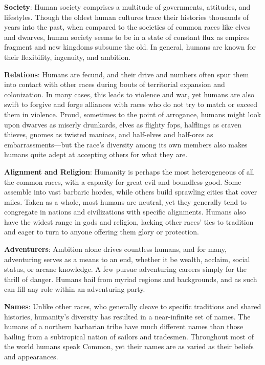 \textbf{Society}: Human society comprises a multitude of governments, attitudes, and lifestyles. Though the oldest human cultures trace their histories thousands of years into the past, when compared to the societies of common races like elves and dwarves, human society seems to be in a state of constant flux as empires fragment and new kingdoms subsume the old. In general, humans are known for their flexibility, ingenuity, and ambition.
				
\textbf{Relations}: Humans are fecund, and their drive and numbers often spur them into contact with other races during bouts of territorial expansion and colonization. In many cases, this leads to violence and war, yet humans are also swift to forgive and forge alliances with races who do not try to match or exceed them in violence. Proud, sometimes to the point of arrogance, humans might look upon dwarves as miserly drunkards, elves as flighty fops, halflings as craven thieves, gnomes as twisted maniacs, and half-elves and half-orcs as embarrassments---but the race's diversity among its own members also makes humans quite adept at accepting others for what they are. 
				
\textbf{Alignment and Religion}: Humanity is perhaps the most heterogeneous of all the common races, with a capacity for great evil and boundless good. Some assemble into vast barbaric hordes, while others build sprawling cities that cover miles. Taken as a whole, most humans are neutral, yet they generally tend to congregate in nations and civilizations with specific alignments. Humans also have the widest range in gods and religion, lacking other races' ties to tradition and eager to turn to anyone offering them glory or protection.
				
\textbf{Adventurers}: Ambition alone drives countless humans, and for many, adventuring serves as a means to an end, whether it be wealth, acclaim, social status, or arcane knowledge. A few pursue adventuring careers simply for the thrill of danger. Humans hail from myriad regions and backgrounds, and as such can fill any role within an adventuring party.
				
\textbf{Names}: Unlike other races, who generally cleave to specific traditions and shared histories, humanity's diversity has resulted in a near-infinite set of names. The humans of a northern barbarian tribe have much different names than those hailing from a subtropical nation of sailors and tradesmen. Throughout most of the world humans speak Common, yet their names are as varied as their beliefs and appearances.
							
